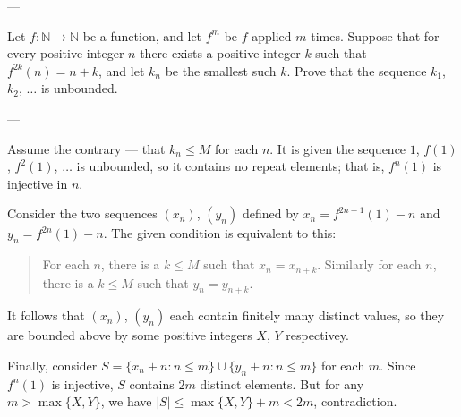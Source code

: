 
---

Let $f:\mathbb N\to\mathbb N$ be a function, and let $f^m$ be $f$ applied $m$ times. Suppose that for every positive integer $n$ there exists a positive integer $k$ such that $f^{2k}(n)=n+k$, and let $k_n$ be the smallest such $k$. Prove that the sequence $k_1$, $k_2$, $\ldots$ is unbounded.

---

Assume the contrary --- that $k_n\le M$ for each $n$. It is given the sequence $1$, $f(1)$, $f^2(1)$, $\ldots$ is unbounded, so it contains no repeat elements; that is, $f^n(1)$ is injective in $n$.

Consider the two sequences $(x_n)$, $(y_n)$ defined by $x_n=f^{2n-1}(1)-n$ and $y_n=f^{2n}(1)-n$. The given condition is equivalent to this:
\begin{quote}
    For each $n$, there is a $k\le M$ such that $x_n=x_{n+k}$. Similarly for each $n$, there is a $k\le M$ such that $y_n=y_{n+k}$.
\end{quote}
It follows that $(x_n)$, $(y_n)$ each contain finitely many distinct values, so they are bounded above by some positive integers $X$, $Y$ respectivey.

Finally, consider $S=\{x_n+n:n\le m\}\cup\{y_n+n:n\le m\}$ for each $m$. Since $f^n(1)$ is injective, $S$ contains $2m$ distinct elements. But for any $m>\max\{X,Y\}$, we have $|S|\le\max\{X,Y\}+m<2m$, contradiction.

